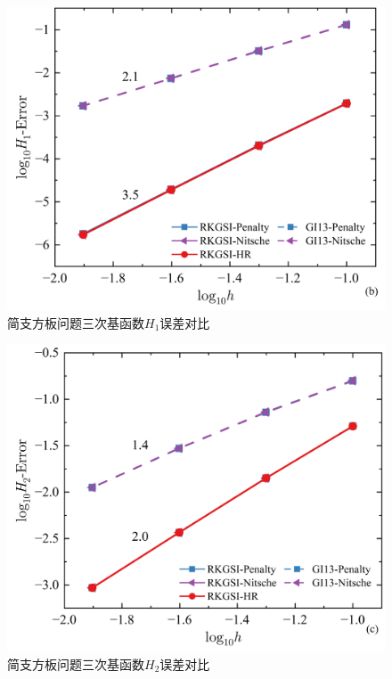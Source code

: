 \begin{figure}[H]
    \centering
    \includegraphics[scale=0.5]{figure/PHR/R/CH1.png}
    \caption{简支方板问题三次基函数$H_1$误差对比}
\end{figure}
\begin{figure}[H]
    \centering
    \includegraphics[scale=0.5]{figure/PHR/R/CH2.png}
    \caption{简支方板问题三次基函数$H_2$误差对比}
\end{figure}
